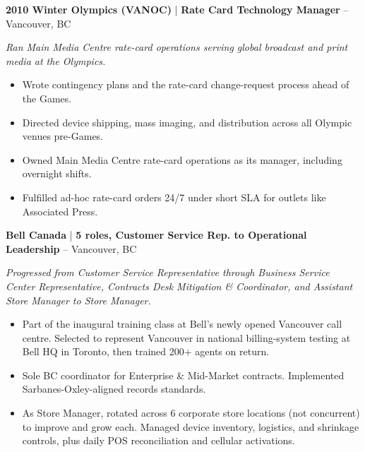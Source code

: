 \documentclass[11pt,a4paper,sans]{moderncv}
\renewcommand*{\labelitemi}{}
\newcommand{\cvoneline}[4]{%
  \noindent\textbf{#1} \normalfont | \textbf{#2} -- #3%
  \ifthenelse{\equal{#4}{}}{}{\hfill#4}%
  \par\vspace{1pt}%
}
\newcommand{\bulletitemize}{\renewcommand*{\labelitemi}{\strut\textcolor{color1}{\textbullet}}}
\begin{document}
\vspace{3pt}

\cvoneline{2010 Winter Olympics (VANOC)}{Rate Card Technology Manager}{Vancouver, BC}{}
\textit{Ran Main Media Centre rate-card operations serving global broadcast and print media at the Olympics.}
{\bulletitemize
\begin{itemize}
    \item Wrote contingency plans and the rate-card change-request process ahead of the Games.
    \item Directed device shipping, mass imaging, and distribution across all Olympic venues pre-Games.
    \item Owned Main Media Centre rate-card operations as its manager, including overnight shifts.
    \item Fulfilled ad-hoc rate-card orders 24/7 under short SLA for outlets like Associated Press.
\end{itemize}}

\vspace{3pt}

\cvoneline{Bell Canada}{5 roles, Customer Service Rep. to Operational Leadership}{Vancouver, BC}{}
\textit{Progressed from Customer Service Representative through Business Service Center Representative, Contracts Desk Mitigation \& Coordinator, and Assistant Store Manager to Store Manager.}
{\bulletitemize
\begin{itemize}
    \item Part of the inaugural training class at Bell's newly opened Vancouver call centre. Selected to represent Vancouver in national billing-system testing at Bell HQ in Toronto, then trained 200+ agents on return.
    \item Sole BC coordinator for Enterprise \& Mid-Market contracts. Implemented Sarbanes-Oxley-aligned records standards.
    \item As Store Manager, rotated across 6 corporate store locations (not concurrent) to improve and grow each. Managed device inventory, logistics, and shrinkage controls, plus daily POS reconciliation and cellular activations.
\end{itemize}}
\end{document}
